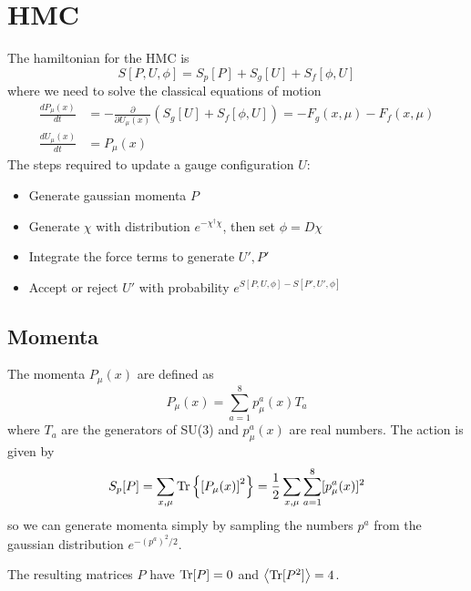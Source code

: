 \documentclass[a4paper,12pt]{article}
\newcommand{\Tr}{{\rm Tr}}
\begin{document}
\section{HMC}
The hamiltonian for the HMC is
\begin{equation}
 S[P, U, \phi] = S_p[P] + S_g[U] + S_f[\phi, U]
\end{equation}
where we need to solve the classical equations of motion
\begin{align}
 \frac{dP_{\mu}(x)}{dt} &= -\frac{\partial}{\partial U_{\mu}(x)}(S_g[U] + S_f[\phi, U]) = -F_g(x,\mu) - F_f(x,\mu) \\
 \frac{dU_{\mu}(x)}{dt} &= P_{\mu}(x)
\end{align}
The steps required to update a gauge configuration $U$:
\begin{itemize}
 \item Generate gaussian momenta $P$
 \item Generate $\chi$ with distribution $e^{-\chi^{\dagger}\chi}$, then set $\phi = D\chi$
 \item Integrate the force terms to generate $U', P'$
 \item Accept or reject $U'$ with probability $e^{S[P, U, \phi] - S[P', U', \phi]}$
\end{itemize}

\subsection{Momenta}
The momenta $P_{\mu}(x)$ are defined as
\begin{equation}
 P_{\mu}(x) = \sum_{a=1}^8 p^a_{\mu}(x) T_a 
\end{equation}
where $T_a$ are the generators of SU(3) and $p^a_{\mu}(x)$ are real numbers.
The action is given by
\begin{equation}
 S_p[P] = \sum_{x,\mu}\Tr\left\{\left[P_{\mu}(x)\right]^2\right\} = \frac{1}{2}\sum_{x,\mu}\sum_{a=1}^8 [p^a_{\mu}(x)]^2
\end{equation}
so we can generate momenta simply by sampling the numbers $p^a$ from the gaussian distribution $e^{-(p^a)^2/2}$.

The resulting matrices $P$ have $\Tr[P]=0$ and $\left\langle \Tr [P^2]\right\rangle = 4$.
\end{document}
